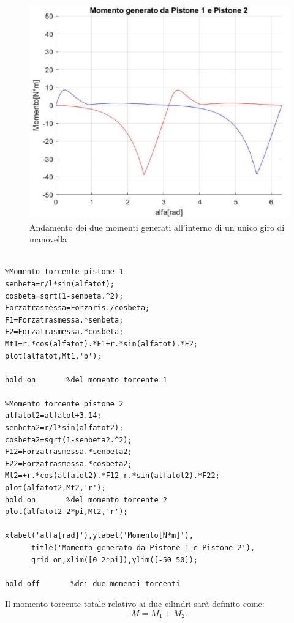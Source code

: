 \begin{figure}[h]
    \centering
    \includegraphics[scale=0.5]{Immagini/GraficoMomento1e2.png}
    \caption{Andamento dei due momenti generati all'interno di un unico giro di manovella}
    \label{fig:GraficoMomento1e2}
\end{figure}
\begin{lstlisting}[frame=trBL]
%%Momento torcente dei due pistoni insieme

%Momento torcente pistone 1
senbeta=r/l*sin(alfatot);
cosbeta=sqrt(1-senbeta.^2);
Forzatrasmessa=Forzaris./cosbeta;
F1=Forzatrasmessa.*senbeta;
F2=Forzatrasmessa.*cosbeta;
Mt1=r.*cos(alfatot).*F1+r.*sin(alfatot).*F2;
plot(alfatot,Mt1,'b');

hold on       %del momento torcente 1

%Momento torcente pistone 2
alfatot2=alfatot+3.14;
senbeta2=r/l*sin(alfatot2);
cosbeta2=sqrt(1-senbeta2.^2);
F12=Forzatrasmessa.*senbeta2;
F22=Forzatrasmessa.*cosbeta2;
Mt2=+r.*cos(alfatot2).*F12-r.*sin(alfatot2).*F22;
plot(alfatot2,Mt2,'r');
hold on       %del momento torcente 2
plot(alfatot2-2*pi,Mt2,'r');

xlabel('alfa[rad]'),ylabel('Momento[N*m]'),
      title('Momento generato da Pistone 1 e Pistone 2'),
      grid on,xlim([0 2*pi]),ylim([-50 50]);

hold off       %dei due momenti torcenti
\end{lstlisting}
Il momento torcente totale relativo ai due cilindri sarà definito come:
\begin{equation}
    M=M_1+M_2.
\end{equation}
